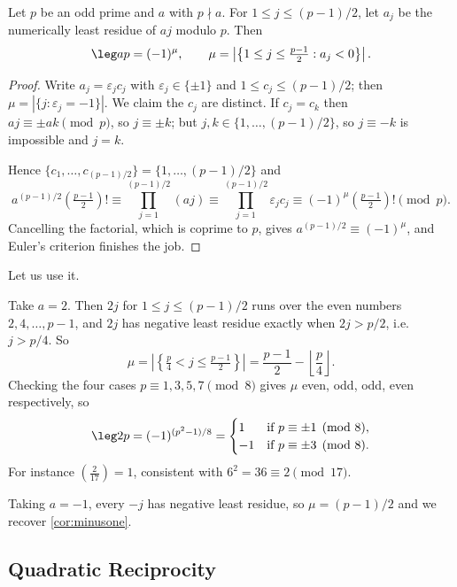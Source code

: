 \begin{theorem}\label{nt-thm:gauss}
	Let $p$ be an odd prime and $a$ with $p \nmid a$. For $1 \leq j \leq (p-1)/2$, let $a_j$ be the numerically least residue of $aj$ modulo $p$. Then
	$$
	\leg ap = (-1)^\mu, \qquad \mu = \left|\left\{ 1 \leq j \leq \tfrac{p-1}2 : a_j < 0 \right\}\right|.
	$$
\end{theorem}
\begin{proof}
	Write $a_j = \varepsilon_j c_j$ with $\varepsilon_j \in \{\pm 1\}$ and $1 \leq c_j \leq (p-1)/2$; then $\mu = |\{j : \varepsilon_j = -1\}|$. We claim the $c_j$ are distinct. If $c_j = c_k$ then $aj \equiv \pm ak \pmod p$, so $j \equiv \pm k$; but $j, k \in \{1, \dots, (p-1)/2\}$, so $j \equiv -k$ is impossible and $j = k$.

	Hence $\{c_1, \dots, c_{(p-1)/2}\} = \{1, \dots, (p-1)/2\}$ and
	$$
	a^{(p-1)/2}\left(\tfrac{p-1}2\right)! \equiv \prod_{j=1}^{(p-1)/2}(aj) \equiv \prod_{j=1}^{(p-1)/2}\varepsilon_j c_j \equiv (-1)^\mu \left(\tfrac{p-1}2\right)! \pmod p.
	$$
	Cancelling the factorial, which is coprime to $p$, gives $a^{(p-1)/2} \equiv (-1)^\mu$, and Euler's criterion finishes the job.
\end{proof}

Let us use it.

\begin{example}\label{ex:two}
	Take $a = 2$. Then $2j$ for $1 \leq j \leq (p-1)/2$ runs over the even numbers $2, 4, \dots, p-1$, and $2j$ has negative least residue exactly when $2j > p/2$, i.e.\ $j > p/4$. So
	$$
	\mu = \left|\left\{ \tfrac p4 < j \leq \tfrac{p-1}2 \right\}\right| = \frac{p-1}{2} - \left\lfloor \frac p4 \right\rfloor.
	$$
	Checking the four cases $p \equiv 1, 3, 5, 7 \pmod 8$ gives $\mu$ even, odd, odd, even respectively, so
	$$
	\leg 2p = (-1)^{(p^2 - 1)/8} = \begin{cases}
		1 & \text{if } p \equiv \pm 1 \pmod 8, \\
		-1 & \text{if } p \equiv \pm 3 \pmod 8.
	\end{cases}
	$$
	For instance $\left( \frac2{17} \right) = 1$, consistent with $6^2 = 36 \equiv 2 \pmod{17}$.
\end{example}

\begin{example}
	Taking $a = -1$, every $-j$ has negative least residue, so $\mu = (p-1)/2$ and we recover \autoref{cor:minusone}.
\end{example}

\subsection{Quadratic Reciprocity}

